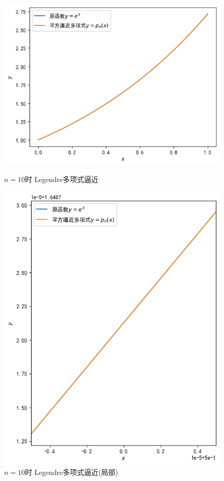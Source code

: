 \documentclass[UTF8,ctexart,a4paper,11pt,openany]{article}
\theoremstyle{definition}
\begin{document}
    \begin{figure}[H]
            \centering
        
        \begin{minipage}{0.49\linewidth}
            \centering
            \includegraphics[width=0.9\linewidth]{pics/P5.4.png}
            \caption{$n=10$时 Legendre多项式逼近}
        \end{minipage}
        \begin{minipage}{0.49\linewidth}
            \centering
            \includegraphics[width=0.9\linewidth]{pics/P5.6.png}
            \caption{$n=10$时 Legendre多项式逼近(局部)}
        \end{minipage}
    \end{figure}
\end{document}
